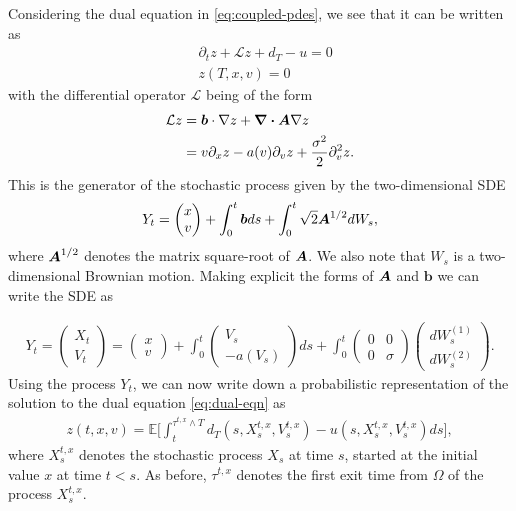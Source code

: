 Considering the dual equation in \autoref{eq:coupled-pdes}, we see that it can be written as
%
\begin{align} 
    \label{eq:dual-eqn}
    &\partial_t z + \mathcal{L} z + d_T - u = 0 \\
    &z(T,x,v) = 0
\end{align}
%
with the differential operator $\mathcal{L}$ being of the form
%
\begin{align} 
    \mathcal{L}z &= \boldsymbol{b}\cdot \nabla z + \div{\boldsymbol{A}\nabla z} \\
    &= v \partial_x z - a(v) \partial_v z + \frac{\sigma^2}{2}\partial^2_v z.
\end{align}
%
This is the generator of the stochastic process given by the two-dimensional SDE
%
\begin{align} 
    Y_t &= \begin{pmatrix}
        x\\
        v
    \end{pmatrix} 
    + \int_0^t \boldsymbol{b} ds + \int_0^t \sqrt{2}\boldsymbol{A}^{1/2} dW_s,\\
\end{align}
%
where $\boldsymbol{A}^{1/2}$ denotes the matrix square-root of $\boldsymbol{A}$. We also note that $W_s$ is a two-dimensional Brownian motion. Making explicit the forms of $\boldsymbol{A}$ and $\mathbf{b}$ we can write the SDE as

%
\begin{align}
    \label{eq:model-sde}
    Y_t = 
\begin{pmatrix}
    X_t\\
    V_t
\end{pmatrix}
= 
\begin{pmatrix}
    x\\
    v
\end{pmatrix}
+ \int_0^t 
\begin{pmatrix}
    V_s\\
    -a(V_s)
\end{pmatrix}
ds 
+ \int_0^t
\begin{pmatrix}
    0 & 0\\
    0 & \sigma 
\end{pmatrix}
\begin{pmatrix}
    dW_s^{(1)}\\
    dW_s^{(2)}
\end{pmatrix}.
\end{align}
%
Using the process $Y_t$, we can now write down a probabilistic representation of the solution to the dual equation \autoref{eq:dual-eqn} as
%
\begin{align}
    z(t,x,v) = \mathbb{E} \bigg[\int_t^{\tau^{t,x}\wedge T} d_T(s,X_s^{t,x},V_s^{t,x}) - u(s,X_s^{t,x},V_s^{t,x}) ds \bigg],
\end{align}
%
where $X_s^{t,x}$ denotes the stochastic process $X_s$ at time $s$, started at the initial value $x$ at time $t<s$. As before, $\tau^{t,x}$ denotes the first exit time from $\Omega$ of the process $X_s^{t,x}$.

